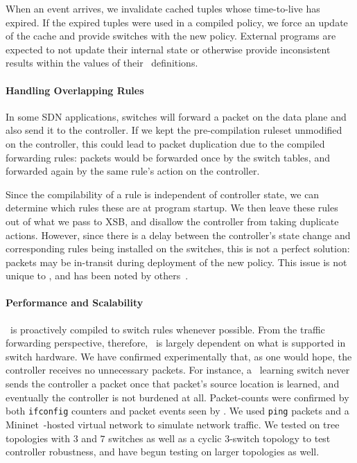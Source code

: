 When an event arrives, we invalidate cached tuples whose time-to-live has expired.
If the expired tuples were used in a compiled policy, we force an
update of the cache and provide switches with the new policy.
External programs are expected to not update their internal state or otherwise
provide inconsistent results within the  values of their \flowlog\ definitions.

\paragraph{Handling Overlapping Rules}

In some SDN applications, switches will forward a packet on the
data plane and also send it to the controller. If we kept the pre-compilation
ruleset unmodified on the controller, this could lead to packet duplication
due to the compiled forwarding rules:
packets would be forwarded once by the switch tables, and forwarded again by
the same rule's action on the controller.

Since the compilability of a rule is independent of controller state, we can
determine which rules these are at program startup. We then leave these rules
out of what we pass to XSB, and disallow the controller from taking duplicate
actions. However, since there is a delay between the controller's state change
and corresponding rules being installed on the switches, this is not a perfect
solution: packets may be in-transit during deployment of the new policy. This
issue is not unique to \flowlog, and has been noted by
others~\cite{reitblatt:sigcomm12-consistent-updates}.

\paragraph{Performance and Scalability}

\flowlog\ is proactively compiled to switch rules whenever
possible. From the traffic
forwarding perspective, therefore, \flowlog\ is largely dependent on what is
supported in switch hardware.
We have confirmed experimentally that, as one would hope, the controller
receives no unnecessary packets. For instance, a \flowlog\ learning switch
never sends the controller a packet once that packet's source location is 
learned, and eventually the controller is not burdened at all. Packet-counts
were confirmed by both {\tt ifconfig} counters
and packet events seen by \flowlog. We used {\tt ping}
packets and a Mininet~\cite{lantz++:hotnets10-mininet}-hosted virtual network to simulate network traffic.
We tested on tree topologies with $3$ and $7$ switches
as well as a cyclic $3$-switch topology to test controller robustness, and have begun
testing on larger topologies as well.


